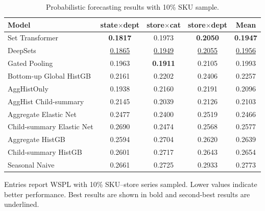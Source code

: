 \documentclass[12pt]{article}
\begin{document}
\begin{table}[H]
  \centering
  \caption{Probabilistic forecasting results with 10\% SKU sample.}
  \label{tab:appendix_quantile_10pct}
  \begin{threeparttable}
    \begin{tabular}{lcccc}
      \toprule
      Model                     & state$\times$dept  & store$\times$cat   & store$\times$dept  & Mean               \\
      \midrule
      Set Transformer                & \textbf{0.1817}    & 0.1973             & \textbf{0.2050}    & \textbf{0.1947}    \\
      DeepSets                       & \underline{0.1865} & \underline{0.1949} & \underline{0.2055} & \underline{0.1956} \\
      Gated Pooling                  & 0.1963             & \textbf{0.1911}    & 0.2105             & 0.1993             \\
      Bottom-up Global HistGB        & 0.2161             & 0.2202             & 0.2406             & 0.2257             \\
      AggHistOnly                    & 0.1938             & 0.2160             & 0.2191             & 0.2096             \\
      AggHist Child-summary          & 0.2145             & 0.2039             & 0.2126             & 0.2103             \\
      Aggregate Elastic Net          & 0.2477             & 0.2400             & 0.2519             & 0.2466             \\
      Child-summary Elastic Net      & 0.2690             & 0.2474             & 0.2568             & 0.2577             \\
      Aggregate HistGB               & 0.2594             & 0.2704             & 0.2620             & 0.2639             \\
      Child-summary HistGB           & 0.2601             & 0.2717             & 0.2643             & 0.2654             \\
      Seasonal Naive                 & 0.2661             & 0.2725             & 0.2933             & 0.2773             \\
      \bottomrule
    \end{tabular}
    \begin{tablenotes}
      \footnotesize \item Entries report WSPL with 10\% SKU--store series sampled. Lower values indicate better performance. Best results are shown in bold and second-best results are underlined.
    \end{tablenotes}
  \end{threeparttable}
\end{table}
\end{document}
